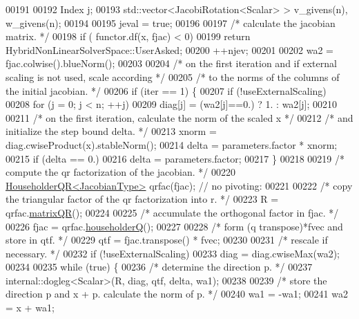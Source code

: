 \begin{DoxyCode}
00191 
00192     Index j;
00193     std::vector<JacobiRotation<Scalar> > v\_givens(n), w\_givens(n);
00194 
00195     jeval = \textcolor{keyword}{true};
00196 
00197     \textcolor{comment}{/* calculate the jacobian matrix. */}
00198     \textcolor{keywordflow}{if} ( functor.df(x, fjac) < 0)
00199         \textcolor{keywordflow}{return} HybridNonLinearSolverSpace::UserAsked;
00200     ++njev;
00201 
00202     wa2 = fjac.colwise().blueNorm();
00203 
00204     \textcolor{comment}{/* on the first iteration and if external scaling is not used, scale according */}
00205     \textcolor{comment}{/* to the norms of the columns of the initial jacobian. */}
00206     \textcolor{keywordflow}{if} (iter == 1) \{
00207         \textcolor{keywordflow}{if} (!useExternalScaling)
00208             \textcolor{keywordflow}{for} (j = 0; j < n; ++j)
00209                 diag[j] = (wa2[j]==0.) ? 1. : wa2[j];
00210 
00211         \textcolor{comment}{/* on the first iteration, calculate the norm of the scaled x */}
00212         \textcolor{comment}{/* and initialize the step bound delta. */}
00213         xnorm = diag.cwiseProduct(x).stableNorm();
00214         delta = parameters.factor * xnorm;
00215         \textcolor{keywordflow}{if} (delta == 0.)
00216             delta = parameters.factor;
00217     \}
00218 
00219     \textcolor{comment}{/* compute the qr factorization of the jacobian. */}
00220     \hyperlink{group___q_r___module_class_eigen_1_1_householder_q_r}{HouseholderQR<JacobianType>} qrfac(fjac); \textcolor{comment}{// no pivoting:}
00221 
00222     \textcolor{comment}{/* copy the triangular factor of the qr factorization into r. */}
00223     R = qrfac.\hyperlink{group___q_r___module_ae837f2fb30099212c53b3042c7d699c9}{matrixQR}();
00224 
00225     \textcolor{comment}{/* accumulate the orthogonal factor in fjac. */}
00226     fjac = qrfac.\hyperlink{group___q_r___module_affd506c10ef2d25f56e7b1f9f25ff885}{householderQ}();
00227 
00228     \textcolor{comment}{/* form (q transpose)*fvec and store in qtf. */}
00229     qtf = fjac.transpose() * fvec;
00230 
00231     \textcolor{comment}{/* rescale if necessary. */}
00232     \textcolor{keywordflow}{if} (!useExternalScaling)
00233         diag = diag.cwiseMax(wa2);
00234 
00235     \textcolor{keywordflow}{while} (\textcolor{keyword}{true}) \{
00236         \textcolor{comment}{/* determine the direction p. */}
00237         internal::dogleg<Scalar>(R, diag, qtf, delta, wa1);
00238 
00239         \textcolor{comment}{/* store the direction p and x + p. calculate the norm of p. */}
00240         wa1 = -wa1;
00241         wa2 = x + wa1;

\end{DoxyCode}
